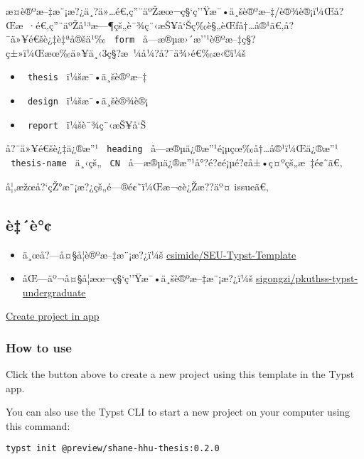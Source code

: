 æ­¤è®ºæ--‡æ¨¡æ?¿ä¸?ä»\ldots é€‚ç''¨äºŽæœ¬ç§`ç''Ÿæ¯•ä¸šè®ºæ--‡/è®¾è®¡ï¼Œå?Œæ~·é€‚ç''¨äºŽå¹³æ---¶çš„è¯¾ç¨‹æŠ¥å`Šç­‰è§„èŒƒå†\ldots å®¹ã€‚å?¯ä»¥é€šè¿‡è‡ªå®šä¹‰
\texttt{\ form\ }
å­---æ®µæ›´æ''¹è®ºæ--‡ç§?ç±»ï¼Œæœ‰ä»¥ä¸‹3ç§?æ~¼å¼?å?¯ä¾›é€‰æ‹©ï¼š

\begin{itemize}
\tightlist
\item
  \texttt{\ thesis\ } ï¼šæ¯•ä¸šè®ºæ--‡
\item
  \texttt{\ design\ } ï¼šæ¯•ä¸šè®¾è®¡
\item
  \texttt{\ report\ } ï¼šè¯¾ç¨‹æŠ¥å`Š
\end{itemize}

å?¯ä»¥é€šè¿‡ä¿®æ''¹ \texttt{\ heading\ }
å­---æ®µä¿®æ''¹é¡µçœ‰å†\ldots å®¹ï¼Œä¿®æ''¹ \texttt{\ thesis-name\ }
ä¸‹çš„ \texttt{\ CN\ } å­---æ®µä¿®æ''¹å°?é?¢é¡µé?¢å±•ç¤ºçš„æ~‡é¢˜ã€‚

å¦‚æžœå?{}`çŽ°æ¨¡æ?¿çš„é---®é¢˜ï¼Œæ¬¢è¿Žæ??äº¤ issueã€‚

\subsection{è‡´è°¢}\label{uxe8uxe8}

\begin{itemize}
\item
  ä¸œå?---å¤§å­¦è®ºæ--‡æ¨¡æ?¿ï¼š
  \href{https://github.com/csimide/SEU-Typst-Template}{csimide/SEU-Typst-Template}
\item
  åŒ---äº¬å¤§å­¦æœ¬ç§`ç''Ÿæ¯•ä¸šè®ºæ--‡æ¨¡æ?¿ï¼š
  \href{https://github.com/sigongzi/pkuthss-typst-undergraduate}{sigongzi/pkuthss-typst-undergraduate}
\end{itemize}

\href{/app?template=shane-hhu-thesis&version=0.2.0}{Create project in
app}

\subsubsection{How to use}\label{how-to-use}

Click the button above to create a new project using this template in
the Typst app.

You can also use the Typst CLI to start a new project on your computer
using this command:

\begin{verbatim}
typst init @preview/shane-hhu-thesis:0.2.0
\end{verbatim}



